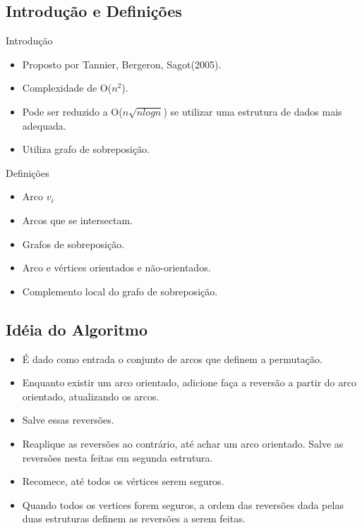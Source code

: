 \documentclass{beamer}
\begin{document}
\subsection{Introdução e Definições}

\begin{frame}{Introdução}
	\begin{itemize}
		\item Proposto por Tannier, Bergeron, Sagot(2005).
		\item Complexidade de O($n^{2}$).
		\pause \item Pode ser reduzido a O($n \sqrt{nlogn}$) se utilizar uma estrutura de dados mais adequada.
		\pause \item Utiliza grafo de sobreposição.
	\end{itemize}
\end{frame}

\begin{frame} {Definições}
	\begin{itemize}
		\item Arco $v_{i}$
		\item Arcos que se intersectam.
		\item Grafos de sobreposição.
		\item Arco e vértices orientados e não-orientados.
		\item Complemento local do grafo de sobreposição.
	\end{itemize}
\end{frame}

\subsection{Idéia do Algoritmo}

\begin{frame}
	\begin{itemize}
		\item É dado como entrada o conjunto de arcos que definem a permutação.
		\item Enquanto existir um arco orientado, adicione faça a reversão a partir do arco orientado, atualizando os arcos.
		\item Salve essas reversões.
		\item Reaplique as reversões ao contrário, até achar um arco orientado. Salve as reversões nesta feitas em segunda estrutura.
		\item Recomece, até todos os vértices serem seguros.
		\item Quando todos os vertices forem seguros, a ordem das reversões dada pelas duas estruturas definem as reversões a serem feitas.
	\end{itemize} 
\end{frame}
\end{document}
